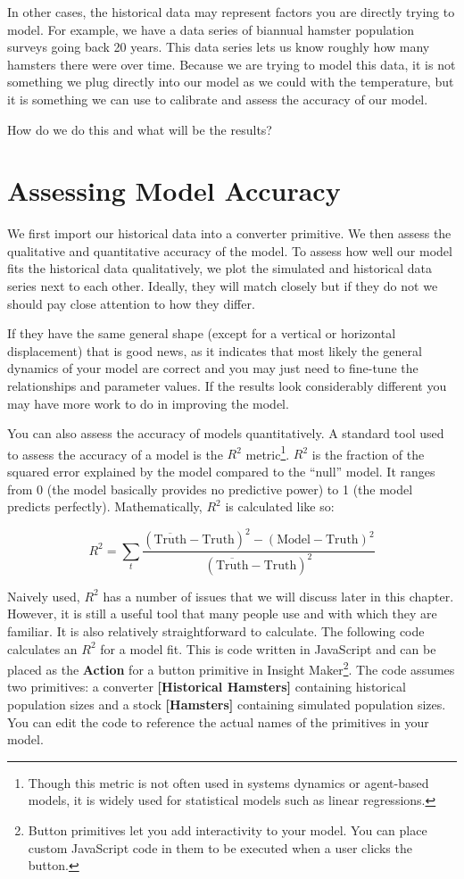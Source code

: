 \documentclass[]{memoir}
\newcommand{\p}[1]{\textbf{{[}#1{]}}}
\renewcommand{\a}[1]{\textbf{#1}}
\begin{document}
In other cases, the historical data may represent factors you are
directly trying to model. For example, we have a data series of biannual
hamster population surveys going back 20 years. This data series lets us
know roughly how many hamsters there were over time. Because we are
trying to model this data, it is not something we plug directly into our
model as we could with the temperature, but it is something we can use
to calibrate and assess the accuracy of our model.

How do we do this and what will be the results?

\section{Assessing Model Accuracy}

We first import our historical data into a converter primitive. We then
assess the qualitative and quantitative accuracy of the model. To assess
how well our model fits the historical data qualitatively, we plot the
simulated and historical data series next to each other. Ideally, they
will match closely but if they do not we should pay close attention to
how they differ.

If they have the same general shape (except for a vertical or horizontal
displacement) that is good news, as it indicates that most likely the
general dynamics of your model are correct and you may just need to
fine-tune the relationships and parameter values. If the results look
considerably different you may have more work to do in improving the
model.

You can also assess the accuracy of models quantitatively. A standard
tool used to assess the accuracy of a model is the $R^2$
metric\footnote{Though this metric is not often used in systems dynamics
  or agent-based models, it is widely used for statistical models such
  as linear regressions.}. $R^2$ is the fraction of the squared error
explained by the model compared to the ``null'' model. It ranges from 0
(the model basically provides no predictive power) to 1 (the model
predicts perfectly). Mathematically, $R^2$ is calculated like so:

\[ R^2 = \sum_{t} \frac{ (\overline{\text{Truth}}-\text{Truth})^2 - (\text{Model} - \text{Truth})^2}{(\overline{\text{Truth}} - \text{Truth})^2} \]

Naively used, $R^2$ has a number of issues that we will discuss later in
this chapter. However, it is still a useful tool that many people use
and with which they are familiar. It is also relatively straightforward
to calculate. The following code calculates an $R^2$ for a model fit.
This is code written in JavaScript and can be placed as the \a{Action}
for a button primitive in Insight Maker\footnote{Button primitives let
  you add interactivity to your model. You can place custom JavaScript
  code in them to be executed when a user clicks the button.}. The code
assumes two primitives: a converter \p{Historical Hamsters} containing
historical population sizes and a stock \p{Hamsters} containing
simulated population sizes. You can edit the code to reference the
actual names of the primitives in your model.
\end{document}
